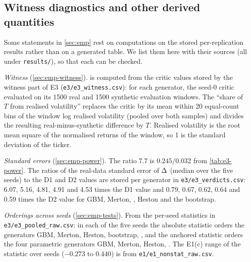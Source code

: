 \begin{table}[tbp]
  \centering
  \caption{Amisano--Giacomini comparisons of the predictive log-scores on \TEST{} (E3, 615 days,
    100 tickers). $d_t$: daily log-score of model a minus model b. Pooled: cross-sectional mean of
    $d_t$, Driscoll--Kraay $z$ and p-value. Per ticker: HAC-studentised mean of $d_t$; ``a
    better'' and ``b better'': tickers with a significant difference in that direction after
    Benjamini--Hochberg at 5\%; last column: tickers with $z>0$.}
  \label{tab:e3-likelihood-ag}
  \small
\end{table}

\subsection{Witness diagnostics and other derived quantities}\label{app:emp-derived}

Some statements in \cref{sec:emp} rest on computations on the stored per-replication results
rather than on a generated table. We list them here with their sources (all under
\texttt{results/}), so that each can be checked.

\emph{Witness} (\cref{sec:emp-witness}).  is computed from the critic
values stored by the witness part of E3 (\texttt{e3/e3\_witness.csv}): for each generator, the
seed-0 critic evaluated on its 1500 real and 1500 synthetic evaluation windows. The ``share of
$T$ from realised volatility'' replaces the critic by its mean within 20 equal-count bins of the
window log realised volatility (pooled over both samples) and divides the resulting
real-minus-synthetic difference by $T$. Realised volatility is the root mean square of the
normalised returns of the window, so 1 is the \TRAIN{} standard deviation of the ticker.

\emph{Standard errors} (\cref{sec:emp-power}). The ratio 7.7 is $0.245/0.032$ from
\cref{tab:e3-power}. The ratios of the real-data standard error of $\Delta$ (median over the five
seeds) to the D1 and D2 values are stored per generator in \texttt{e3/e3\_verdicts.csv}: 6.07, 5.16,
4.81, 4.91 and 4.53 times the D1 value and 0.79, 0.67, 0.62, 0.64 and 0.59 times the D2 value for
GBM, Merton, \GARCHt{}, Heston and the bootstrap.

\emph{Orderings across seeds} (\cref{sec:emp-tests}). From the per-seed statistics in
\texttt{e3/e3\_pooled\_raw.csv}: in each of the five seeds the absolute \WC{} statistic orders
the generators GBM, Merton, Heston, bootstrap, \GARCHt{}, and the anchored statistic orders the
four parametric generators GBM, Merton, Heston, \GARCHt{}. The E1(c) range of the \WC{} statistic
over seeds ($-0.273$ to $0.440$) is from \texttt{e1/e1\_nonstat\_raw.csv}.

